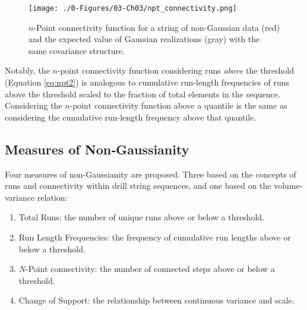 \begin{figure}[htb!]
    \centering
    \texttt{[image: ./0-Figures/03-Ch03/npt\_connectivity.png]}
    \caption{$n$-Point connectivity function for a string of non-Gaussian data (red) and the expected value of Gaussian realizations (gray) with the same covariance structure.}
    \label{fig:npt_connectivity}
\end{figure}

Notably, the $n\text{-point}$ connectivity function considering runs \emph{above} the threshold (Equation \ref{eq:npt2}) is analogous to cumulative run-length frequencies of runs above the threshold scaled to the fraction of total elements in the sequence. Considering the $n\text{-point}$ connectivity function above a quantile is the same as considering the cumulative run-length frequency above that quantile.

\subsection{Measures of Non‐Gaussianity}
\label{subsec:03ngmeasures}

Four measures of non-Gaussianity are proposed. Three based on the concepts of runs and connectivity within drill string sequences, and one based on the volume-variance relation:
\begin{enumerate}[noitemsep]
    \item Total Runs: the number of unique runs above or below a threshold.
    \item Run Length Frequencies: the frequency of cumulative run lengths above or below a threshold.
    \item $N$-Point connectivity: the number of connected steps above or below a threshold.
    \item Change of Support: the relationship between continuous variance and scale.
\end{enumerate}

